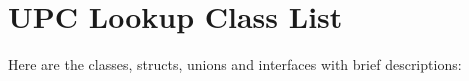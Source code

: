 \section{UPC Lookup Class List}
Here are the classes, structs, unions and interfaces with brief descriptions:\begin{CompactList}
\item{}
\end{CompactList}
